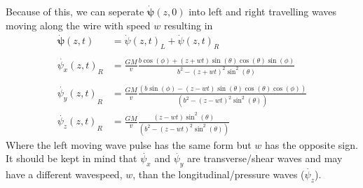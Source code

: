 \documentclass{report}
\begin{document}
Because of this, we can seperate $\mathbf{\dot\psi}(z,0)$ into left and right travelling waves moving along the wire with speed $w$ resulting in
\begin{align}
    \mathbf{\dot{\psi}} (z, t) &= {\dot{\psi} (z, t)}_L + {\dot{\psi} (z, t)}_R \label{eqn:velocity pulse}\\
    \nonumber\\
    \nonumber {\dot{\psi_x} (z, t)}_R &= \frac{G M}{v} \frac{b \cos (\phi )+ (z + w t) \sin (\theta ) \cos (\theta ) \sin (\phi )}{b^2-{(z + w t)}^2 \sin ^2(\theta )}\\
    \nonumber\\
    \nonumber {\dot{\psi_y} (z, t)}_R &= \frac{G M}{v} \frac{(b \sin (\phi )-{(z - w t)} \sin (\theta ) \cos (\theta ) \cos (\phi ))}{\left(b^2-{(z - w t)}^2 \sin ^2(\theta )\right)}
    \nonumber\\
    \nonumber {\dot{\psi_z} (z, t)}_R &= \frac{G M}{v} \frac{{(z - w t)} \sin ^2(\theta )}{\left(b^2-{(z - w t)}^2 \sin ^2(\theta )\right)}
\end{align}
Where the left moving wave pulse has the same form but $w$ has the opposite sign.
It should be kept in mind that $\dot{\psi_x}$ and $\dot{\psi_y}$ are transverse/shear waves and may have a different wavespeed, $w$, than the longitudinal/pressure waves ($\dot{\psi_z}$).
\end{document}
